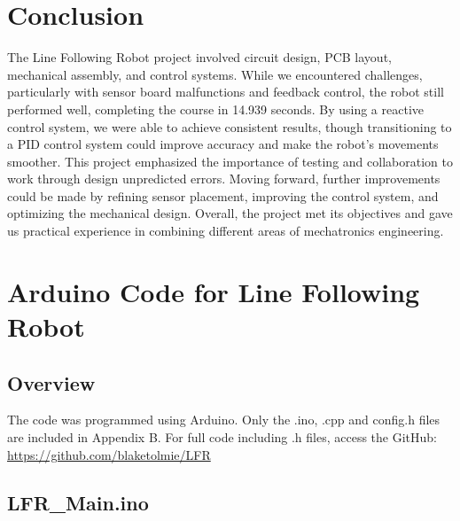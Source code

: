 \documentclass{article}
\begin{document}
\section{Conclusion}
 The Line Following Robot project involved circuit design, PCB layout, mechanical assembly, and control systems. While we encountered challenges, particularly with sensor board malfunctions and feedback control, the robot still performed well, completing the course in 14.939 seconds. By using a reactive control system, we were able to achieve consistent results, though transitioning to a PID control system could improve accuracy and make the robot’s movements smoother. This project emphasized the importance of testing and collaboration to work through design unpredicted errors. Moving forward, further improvements could be made by refining sensor placement, improving the control system, and optimizing the mechanical design. Overall, the project met its objectives and gave us practical experience in combining different areas of mechatronics engineering.

\newpage


\newpage
\appendix
\section{Arduino Code for Line Following Robot}
\subsection{Overview}
The code was programmed using Arduino. Only the .ino, .cpp and config.h files are included in Appendix B. For full code including .h files, access the GitHub: \href{https://github.com/blaketolmie/LFR}{https://github.com/blaketolmie/LFR}
\subsection{LFR\_Main.ino}
\end{document}
